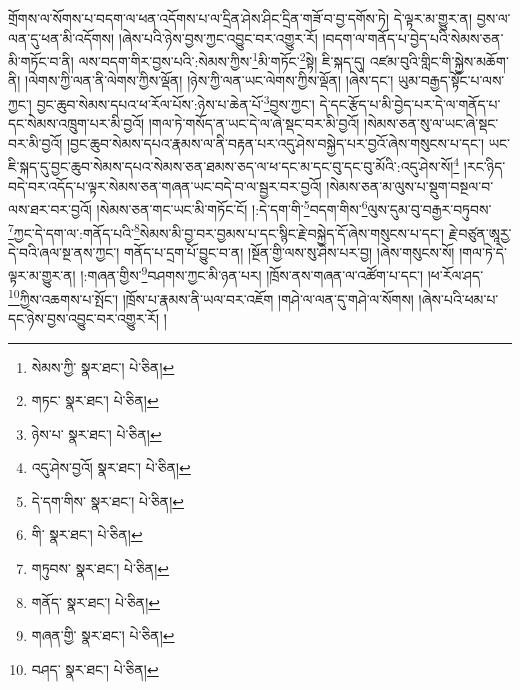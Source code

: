 གྲོགས་ལ་སོགས་པ་བདག་ལ་ཕན་འདོགས་པ་ལ་དྲིན་ཤེས་ཤིང་དྲིན་གཟོ་བ་བྱ་དགོས་ཏེ། དེ་ལྟར་མ་གྱུར་ན། བྱས་ལ་ལན་དུ་ཕན་མི་འདོགས། །ཞེས་པའི་ཉེས་བྱས་ཀྱང་འབྱུང་བར་འགྱུར་རོ། །བདག་ལ་གནོད་པ་བྱེད་པའི་སེམས་ཅན་མི་གཏོང་བ་ནི། ལས་བདག་གིར་བྱས་པའི་:སེམས་ཀྱིས་\footnote{སེམས་ཀྱི་  སྣར་ཐང་།  པེ་ཅིན། }མི་གཏོང་\footnote{གཏང་  སྣར་ཐང་།  པེ་ཅིན། }སྟེ། ཇི་སྐད་དུ། འཛམ་བུའི་གླིང་གི་སྐྱེས་མཆོག་ནི། །ལེགས་ཀྱི་ལན་ནི་ལེགས་ཀྱིས་ལྡོན། །ཉེས་ཀྱི་ལན་ཡང་ལེགས་ཀྱིས་ལྡོན། །ཞེས་དང་། ཡུམ་བརྒྱད་སྟོང་པ་ལས་ཀྱང་། བྱང་ཆུབ་སེམས་དཔའ་ཕ་རོལ་པོས་:ཉེས་པ་ཆེན་པོ་\footnote{ཉེས་པ་  སྣར་ཐང་།  པེ་ཅིན། }བྱས་ཀྱང་། དེ་དང་རྩོད་པ་མི་བྱེད་པར་དེ་ལ་གནོད་པ་དང་སེམས་འཁྲུག་པར་མི་བྱའོ། །གལ་ཏེ་གསོད་ན་ཡང་དེ་ལ་ཞེ་སྡང་བར་མི་བྱའོ། །སེམས་ཅན་སུ་ལ་ཡང་ཞེ་སྡང་བར་མི་བྱའོ། །བྱང་ཆུབ་སེམས་དཔའ་རྣམས་ལ་ནི་བརྟན་པར་འདུ་ཤེས་བསྐྱེད་པར་བྱའོ་ཞེས་གསུངས་པ་དང་། ཡང་ཇི་སྐད་དུ་བྱང་ཆུབ་སེམས་དཔའ་སེམས་ཅན་ཐམས་ཅད་ལ་ཕ་དང་མ་དང་བུ་དང་བུ་མོའི་:འདུ་ཤེས་སོ།\footnote{འདུ་ཤེས་བྱའོ།  སྣར་ཐང་།  པེ་ཅིན། } །རང་ཉིད་བདེ་བར་འདོད་པ་ལྟར་སེམས་ཅན་གཞན་ཡང་བདེ་བ་ལ་སྦྱར་བར་བྱའོ། །སེམས་ཅན་མ་ལུས་པ་སྡུག་བསྔལ་བ་ལས་ཐར་བར་བྱའོ། །སེམས་ཅན་གང་ཡང་མི་གཏོང་ངོ། །:དེ་དག་གི་\footnote{དེ་དག་གིས་  སྣར་ཐང་།  པེ་ཅིན། }བདག་གིས་\footnote{གི་  སྣར་ཐང་།  པེ་ཅིན། }ལུས་དུམ་བུ་བརྒྱར་བཏུབས་\footnote{གཏུབས་  སྣར་ཐང་།  པེ་ཅིན། }ཀྱང་དེ་དག་ལ་:གནོད་པའི་\footnote{གནོད་  སྣར་ཐང་།  པེ་ཅིན། }སེམས་མི་བྱ་བར་བྱམས་པ་དང་སྙིང་རྗེ་བསྐྱེད་དོ་ཞེས་གསུངས་པ་དང་། རྗེ་བཙུན་ཨཱརྱ་དེ་བའི་ཞལ་སྔ་ནས་ཀྱང་། གནོད་པ་དྲག་པོ་བྱུང་བ་ན། །སྔོན་གྱི་ལས་སུ་ཤེས་པར་བྱ། །ཞེས་གསུངས་སོ། །གལ་ཏེ་དེ་ལྟར་མ་གྱུར་ན། །:གཞན་གྱིས་\footnote{གཞན་གྱི་  སྣར་ཐང་།  པེ་ཅིན། }བཤགས་ཀྱང་མི་ཉན་པར། །ཁྲོས་ནས་གཞན་ལ་འཚོག་པ་དང་། །ཕ་རོལ་ཤད་\footnote{བཤད་  སྣར་ཐང་།  པེ་ཅིན། }ཀྱིས་འཆགས་པ་སྤོང་། །ཁྲོས་པ་རྣམས་ནི་ཡལ་བར་འཇོག །གཤེ་ལ་ལན་དུ་གཤེ་ལ་སོགས། །ཞེས་པའི་ཕམ་པ་དང་ཉེས་བྱས་འབྱུང་བར་འགྱུར་རོ། །
